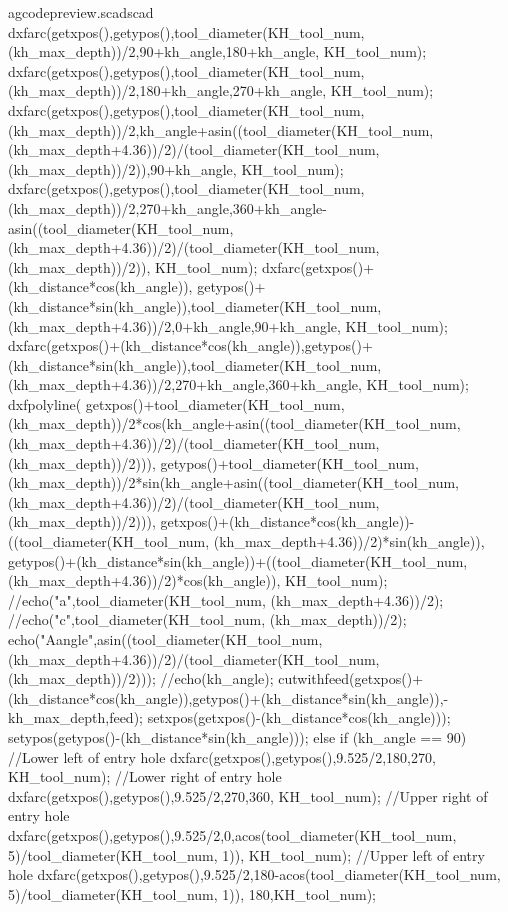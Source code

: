 \documentclass{ltxdoc}
\begin{document}
\begin{writecode}{a}{gcodepreview.scad}{scad}
{  dxfarc(getxpos(),getypos(),tool_diameter(KH_tool_num, (kh_max_depth))/2,90+kh_angle,180+kh_angle, KH_tool_num);
  dxfarc(getxpos(),getypos(),tool_diameter(KH_tool_num, (kh_max_depth))/2,180+kh_angle,270+kh_angle, KH_tool_num);
dxfarc(getxpos(),getypos(),tool_diameter(KH_tool_num, (kh_max_depth))/2,kh_angle+asin((tool_diameter(KH_tool_num, (kh_max_depth+4.36))/2)/(tool_diameter(KH_tool_num, (kh_max_depth))/2)),90+kh_angle, KH_tool_num);
dxfarc(getxpos(),getypos(),tool_diameter(KH_tool_num, (kh_max_depth))/2,270+kh_angle,360+kh_angle-asin((tool_diameter(KH_tool_num, (kh_max_depth+4.36))/2)/(tool_diameter(KH_tool_num, (kh_max_depth))/2)), KH_tool_num);
dxfarc(getxpos()+(kh_distance*cos(kh_angle)),
  getypos()+(kh_distance*sin(kh_angle)),tool_diameter(KH_tool_num, (kh_max_depth+4.36))/2,0+kh_angle,90+kh_angle, KH_tool_num);
dxfarc(getxpos()+(kh_distance*cos(kh_angle)),getypos()+(kh_distance*sin(kh_angle)),tool_diameter(KH_tool_num, (kh_max_depth+4.36))/2,270+kh_angle,360+kh_angle, KH_tool_num);
dxfpolyline( getxpos()+tool_diameter(KH_tool_num, (kh_max_depth))/2*cos(kh_angle+asin((tool_diameter(KH_tool_num, (kh_max_depth+4.36))/2)/(tool_diameter(KH_tool_num, (kh_max_depth))/2))),
 getypos()+tool_diameter(KH_tool_num, (kh_max_depth))/2*sin(kh_angle+asin((tool_diameter(KH_tool_num, (kh_max_depth+4.36))/2)/(tool_diameter(KH_tool_num, (kh_max_depth))/2))),
 getxpos()+(kh_distance*cos(kh_angle))-((tool_diameter(KH_tool_num, (kh_max_depth+4.36))/2)*sin(kh_angle)),
 getypos()+(kh_distance*sin(kh_angle))+((tool_diameter(KH_tool_num, (kh_max_depth+4.36))/2)*cos(kh_angle)), KH_tool_num);
//echo("a",tool_diameter(KH_tool_num, (kh_max_depth+4.36))/2);
//echo("c",tool_diameter(KH_tool_num, (kh_max_depth))/2);
echo("Aangle",asin((tool_diameter(KH_tool_num, (kh_max_depth+4.36))/2)/(tool_diameter(KH_tool_num, (kh_max_depth))/2)));
//echo(kh_angle);
 cutwithfeed(getxpos()+(kh_distance*cos(kh_angle)),getypos()+(kh_distance*sin(kh_angle)),-kh_max_depth,feed);
 setxpos(getxpos()-(kh_distance*cos(kh_angle)));
 setypos(getypos()-(kh_distance*sin(kh_angle)));
  } else if (kh_angle == 90) {
    //Lower left of entry hole
    dxfarc(getxpos(),getypos(),9.525/2,180,270, KH_tool_num);
    //Lower right of entry hole
    dxfarc(getxpos(),getypos(),9.525/2,270,360, KH_tool_num);
    //Upper right of entry hole
    dxfarc(getxpos(),getypos(),9.525/2,0,acos(tool_diameter(KH_tool_num, 5)/tool_diameter(KH_tool_num, 1)), KH_tool_num);
    //Upper left of entry hole
    dxfarc(getxpos(),getypos(),9.525/2,180-acos(tool_diameter(KH_tool_num, 5)/tool_diameter(KH_tool_num, 1)), 180,KH_tool_num);
}
\end{writecode}
\end{document}

